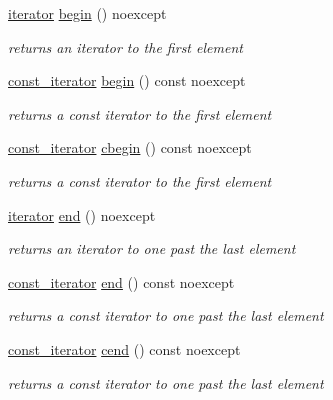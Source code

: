 \begin{DoxyCompactItemize}
\hyperlink{classnlohmann_1_1basic__json_1_1iterator}{iterator} \hyperlink{classnlohmann_1_1basic__json_ad4e381c54039607be08d7af41a1f6ad1}{begin} () noexcept
\begin{DoxyCompactList}\small\item\em returns an iterator to the first element \end{DoxyCompactList}\item 
\hyperlink{classnlohmann_1_1basic__json_1_1const__iterator}{const\-\_\-iterator} \hyperlink{classnlohmann_1_1basic__json_af9587bc58ebfac62b2c6b08799f57c2f}{begin} () const noexcept
\begin{DoxyCompactList}\small\item\em returns a const iterator to the first element \end{DoxyCompactList}\item 
\hyperlink{classnlohmann_1_1basic__json_1_1const__iterator}{const\-\_\-iterator} \hyperlink{classnlohmann_1_1basic__json_a7355a41b0033ff8a27d58550544d5a59}{cbegin} () const noexcept
\begin{DoxyCompactList}\small\item\em returns a const iterator to the first element \end{DoxyCompactList}\item 
\hyperlink{classnlohmann_1_1basic__json_1_1iterator}{iterator} \hyperlink{classnlohmann_1_1basic__json_a12ccf14d39ddae52f6c7e126105a230b}{end} () noexcept
\begin{DoxyCompactList}\small\item\em returns an iterator to one past the last element \end{DoxyCompactList}\item 
\hyperlink{classnlohmann_1_1basic__json_1_1const__iterator}{const\-\_\-iterator} \hyperlink{classnlohmann_1_1basic__json_abd7e95159740e94160c13392b1536eb1}{end} () const noexcept
\begin{DoxyCompactList}\small\item\em returns a const iterator to one past the last element \end{DoxyCompactList}\item 
\hyperlink{classnlohmann_1_1basic__json_1_1const__iterator}{const\-\_\-iterator} \hyperlink{classnlohmann_1_1basic__json_aa730d68d55ccc48d2cd4835ff46d2a0f}{cend} () const noexcept
\begin{DoxyCompactList}\small\item\em returns a const iterator to one past the last element \end{DoxyCompactList}\item 

\end{DoxyCompactItemize}
